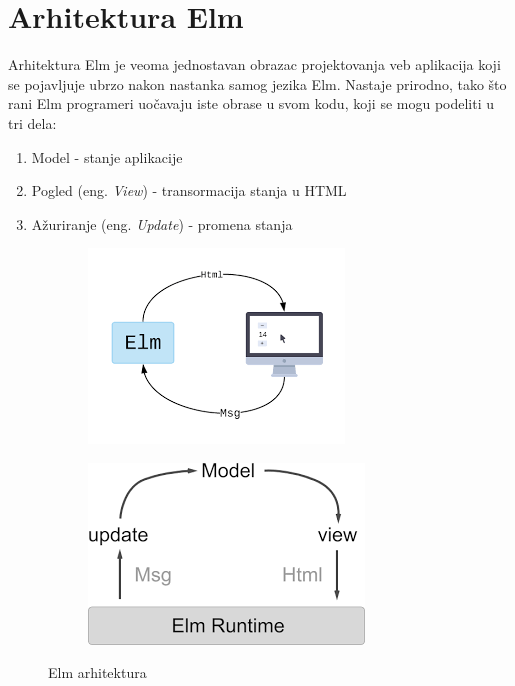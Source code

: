 \documentclass[12pt,oneside]{memoir}
\begin{document}
\section{Arhitektura Elm}
Arhitektura Elm je veoma jednostavan obrazac projektovanja veb aplikacija koji se pojavljuje
ubrzo nakon nastanka samog jezika Elm. Nastaje prirodno, tako što rani Elm programeri uočavaju
iste obrase u svom kodu, koji se mogu podeliti u tri dela:
\begin{enumerate}
  \item Model - stanje aplikacije
  \item Pogled (eng. \emph{View}) - transormacija stanja u HTML
  \item Ažuriranje (eng. \emph{Update}) - promena stanja
\end{enumerate}
\begin{figure}[!ht]
\centering
\begin{subfigure}{.5\textwidth}
  \centering
  \includegraphics[width=.8\linewidth]{elm-arch-site}
\end{subfigure}%
\begin{subfigure}{.5\textwidth}
  \centering
  \includegraphics[width=.7\linewidth]{elm-arch-book}
\end{subfigure}
\caption{Elm arhitektura}
\label{fig:elm-arh}
\end{figure}
\end{document}
